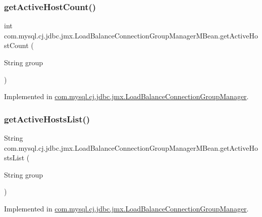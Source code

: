 \subsubsection{\texorpdfstring{get\+Active\+Host\+Count()}{getActiveHostCount()}}
{\footnotesize\ttfamily int com.\+mysql.\+cj.\+jdbc.\+jmx.\+Load\+Balance\+Connection\+Group\+Manager\+M\+Bean.\+get\+Active\+Host\+Count (\begin{DoxyParamCaption}\item[{String}]{group }\end{DoxyParamCaption})}



Implemented in \mbox{\hyperlink{classcom_1_1mysql_1_1cj_1_1jdbc_1_1jmx_1_1_load_balance_connection_group_manager_ad1adadfdbdc920e319033d8e2ae33402}{com.\+mysql.\+cj.\+jdbc.\+jmx.\+Load\+Balance\+Connection\+Group\+Manager}}.

\mbox{\label{interfacecom_1_1mysql_1_1cj_1_1jdbc_1_1jmx_1_1_load_balance_connection_group_manager_m_bean_acab93052475e7203a5d66783ea41a5e4}} 
\subsubsection{\texorpdfstring{get\+Active\+Hosts\+List()}{getActiveHostsList()}}
{\footnotesize\ttfamily String com.\+mysql.\+cj.\+jdbc.\+jmx.\+Load\+Balance\+Connection\+Group\+Manager\+M\+Bean.\+get\+Active\+Hosts\+List (\begin{DoxyParamCaption}\item[{String}]{group }\end{DoxyParamCaption})}



Implemented in \mbox{\hyperlink{classcom_1_1mysql_1_1cj_1_1jdbc_1_1jmx_1_1_load_balance_connection_group_manager_a0854bee1fbfa0efc6b1d53db7bc16ae3}{com.\+mysql.\+cj.\+jdbc.\+jmx.\+Load\+Balance\+Connection\+Group\+Manager}}.

